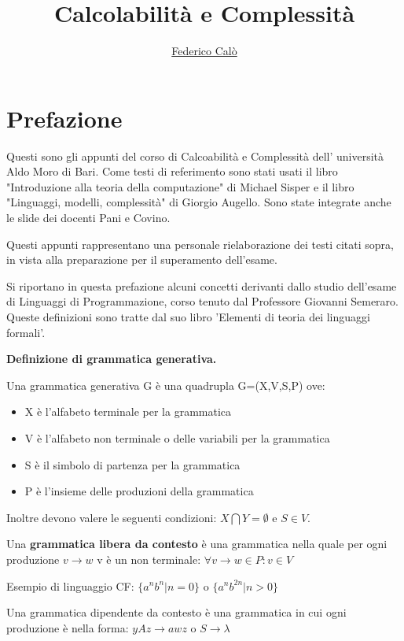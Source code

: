 \documentclass[a4paper]{extarticle}
\title{Calcolabilità e Complessità}
\author{\href{http://www.federicocalo.it}{Federico Calò} }
\date{}
\begin{document}
\maketitle
\newpage
\tableofcontents
\voffset -30pt
\listoffigures
\listoftables

\newpage

\section*{Prefazione}

Questi sono gli appunti del corso di Calcoabilità e Complessità dell' università Aldo Moro di Bari. Come testi di referimento sono stati usati il libro "Introduzione alla teoria della computazione" di Michael Sisper e il libro "Linguaggi, modelli, complessità" di Giorgio Augello. Sono state integrate anche le slide dei docenti Pani e Covino.

Questi appunti rappresentano una personale rielaborazione dei testi citati sopra, in vista alla preparazione per il superamento dell'esame.

Si riportano in questa prefazione alcuni concetti derivanti dallo studio dell'esame di Linguaggi di Programmazione, corso tenuto dal Professore Giovanni Semeraro. Queste definizioni sono tratte dal suo libro 'Elementi di teoria dei linguaggi formali'.

\textbf{Definizione di grammatica generativa.}

Una grammatica generativa G è una quadrupla G=(X,V,S,P) ove:
\begin{itemize}
\item X è l'alfabeto terminale per la grammatica
\item V è l'alfabeto non terminale o delle variabili per la grammatica
\item S è il simbolo di partenza per la grammatica
\item P è l'insieme delle produzioni della grammatica
\end{itemize}
Inoltre devono valere le seguenti condizioni: $X\bigcap Y = \emptyset$ e $ S \in V$.

Una \textbf{grammatica libera da contesto} è una grammatica nella quale per ogni produzione $v\rightarrow w$ v è un non terminale: $\forall v \rightarrow w \in P: v \in V$

Esempio di linguaggio CF: $\{a^nb^n |n=0\}$ o $\{a^nb^{2n} | n>0\}$

Una grammatica dipendente da contesto è una grammatica in cui ogni produzione è nella forma: $yAz\rightarrow awz$ o $S\rightarrow \lambda$
\end{document}
